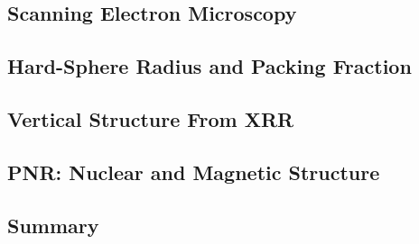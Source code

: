 \documentclass[\main/dresen_thesis.tex]{subfiles}
\renewcommand{\thisPath}{\main/chapters/looselyPackedNS/bilayerStacks}
\begin{document}
  \subsection{Scanning Electron Microscopy}
  
    \FloatBarrier

  \subsection{Hard-Sphere Radius and Packing Fraction}
  
    \FloatBarrier

  \subsection{Vertical Structure From XRR}
  
    \FloatBarrier

  \subsection{PNR: Nuclear and Magnetic Structure}
  
    \FloatBarrier

  \subsection{Summary}
  
    \FloatBarrier
\end{document}
